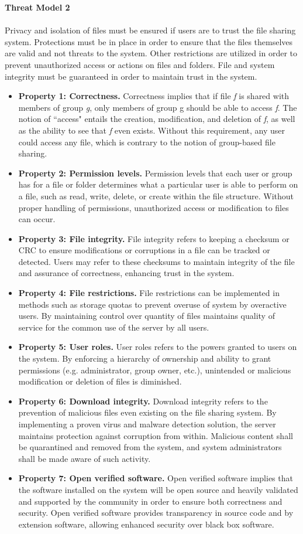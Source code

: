 \documentclass[11pt]{article}
\begin{document}
\textbf{Threat Model 2}\\
\\
Privacy and isolation of files must be ensured if users are to trust the file sharing system. Protections must be in place in order to ensure that the files themselves are valid and not threats to the system. Other restrictions are utilized in order to prevent unauthorized access or actions on files and folders. File and system integrity must be guaranteed in order to maintain trust in the system.
\begin{itemize}
\item \textbf{Property 1: Correctness.} Correctness implies that if file \emph{f} is shared with members of group \emph{g}, only members of group {g} should be able to access \emph{f}. The notion of ``access" entails the creation, modification, and deletion of \emph{f}, as well as the ability to see that \emph{f} even exists. Without this requirement, any user could access any file, which is contrary to the notion of group-based file sharing.
\item \textbf{Property 2: Permission levels.} Permission levels that each user or group has for a file or folder determines what a particular user is able to perform on a file, such as read, write, delete, or create within the file structure. Without proper handling of permissions, unauthorized access or modification to files can occur.
\item \textbf{Property 3: File integrity.} File integrity refers to keeping a checksum or CRC to ensure modifications or corruptions in a file can be tracked or detected. Users may refer to these checksums to maintain integrity of the file and assurance of correctness, enhancing trust in the system.
\item \textbf{Property 4: File restrictions.} File restrictions can be implemented in methods such as storage quotas to prevent overuse of system by overactive users. By maintaining control over quantity of files maintains quality of service for the common use of the server by all users.
\item \textbf{Property 5: User roles.} User roles refers to the powers granted to users on the system. By enforcing a hierarchy of ownership and ability to grant permissions (e.g. administrator, group owner, etc.), unintended or malicious modification or deletion of files is diminished.
\item \textbf{Property 6: Download integrity.} Download integrity refers to the prevention of malicious files even existing on the file sharing system. By implementing a proven virus and malware detection solution, the server maintains protection against corruption from within. Malicious content shall be quarantined and removed from the system, and system administrators shall be made aware of such activity.
\item \textbf{Property 7: Open verified software.} Open verified software implies that the software installed on the system will be open source and heavily validated and supported by the community in order to ensure both correctness and security. Open verified software provides transparency in source code and by extension software, allowing enhanced security over black box software.
\end{itemize}
\end{document}
